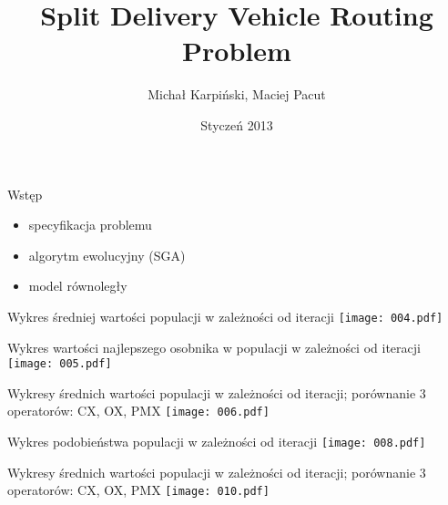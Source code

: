 \documentclass{beamer}
\title{Split Delivery Vehicle Routing Problem}
\author{Michał Karpiński, Maciej Pacut}
\date{Styczeń 2013}
\begin{document}
\maketitle

\begin{frame}{Wstęp}
  \begin{itemize}
    \item specyfikacja problemu
    \item algorytm ewolucyjny (SGA)
    \item model równoległy
  \end{itemize}
\end{frame}

\begin{frame}{Wykres średniej wartości populacji w zależności od iteracji}
  \center\texttt{[image: 004.pdf]}
\end{frame}

\begin{frame}{Wykres wartości najlepszego osobnika w populacji w
    zależności od iteracji}
  \texttt{[image: 005.pdf]}
\end{frame}

\begin{frame}{Wykresy średnich wartości populacji w zależności od
    iteracji; porównanie 3 operatorów: CX, OX, PMX}
  \texttt{[image: 006.pdf]}
\end{frame}

\begin{frame}{Wykres podobieństwa populacji w zależności od iteracji}
  \texttt{[image: 008.pdf]}
\end{frame}


\begin{frame}{Wykresy średnich wartości populacji w zależności od
    iteracji; porównanie 3 operatorów: CX, OX, PMX}
  \texttt{[image: 010.pdf]}
\end{frame}
\end{document}
